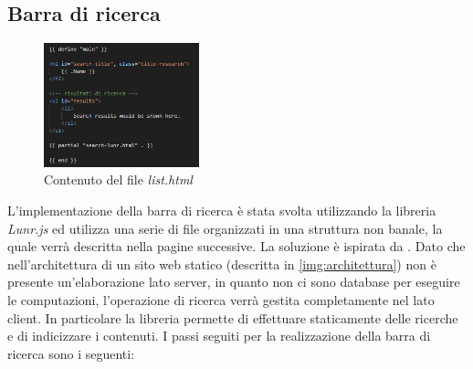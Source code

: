 \documentclass[target=bach,aauheader=]{thud}
\begin{document}
\subsection{Barra di ricerca}
\begin{figure}[b]
    \centering
    \includegraphics[width = 0.4\textwidth]{images/list-html.png}
    \caption{Contenuto del file \textit{list.html}}
    \label{img:list}
\end{figure}
L'implementazione della barra di ricerca è stata svolta utilizzando la libreria \textit{Lunr.js} ed utilizza una serie di file organizzati in una struttura non banale, la quale verrà descritta nella pagine successive.
La soluzione è ispirata da \cite{lunr}.
\newline
Dato che nell'architettura di un sito web statico (descritta in \cref{img:architettura}) non è presente un'elaborazione lato server, in quanto non ci sono database per eseguire le computazioni, l'operazione di ricerca verrà gestita completamente nel lato client.
In particolare la libreria permette di effettuare staticamente delle ricerche e di indicizzare i contenuti. 
I passi seguiti per la realizzazione della barra di ricerca sono i seguenti:
\end{document}
